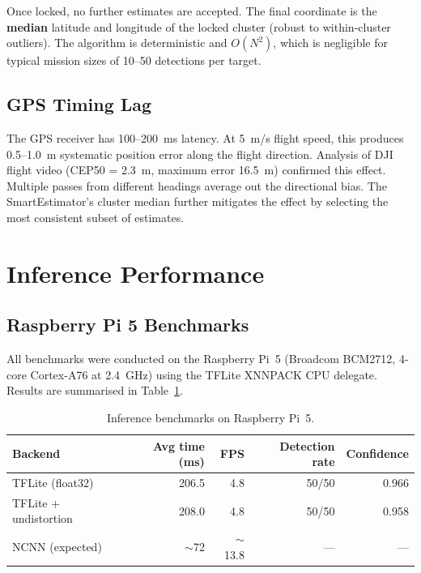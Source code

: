 Once locked, no further estimates are accepted. The final coordinate is the
\textbf{median} latitude and longitude of the locked cluster (robust to within-cluster
outliers). The algorithm is deterministic and $O(N^2)$, which is negligible for
typical mission sizes of 10--50 detections per target.

\subsection{GPS Timing Lag}

The GPS receiver has 100--200~ms latency. At 5~m/s flight speed, this produces
0.5--1.0~m systematic position error along the flight direction. Analysis of DJI
flight video (CEP50 = 2.3~m, maximum error 16.5~m) confirmed this effect.
Multiple passes from different headings average out the directional bias. The
SmartEstimator's cluster median further mitigates the effect by selecting the
most consistent subset of estimates.


\section{Inference Performance}
\label{sec:inference-performance}

\subsection{Raspberry Pi 5 Benchmarks}

All benchmarks were conducted on the Raspberry Pi~5 (Broadcom BCM2712, 4-core
Cortex-A76 at 2.4~GHz) using the TFLite XNNPACK CPU delegate. Results are
summarised in Table~\ref{tab:pi-benchmarks}.

\begin{table}[htbp]
\centering
\caption{Inference benchmarks on Raspberry Pi~5.}
\label{tab:pi-benchmarks}
\begin{tabular}{lrrrr}
\hline
\textbf{Backend} & \textbf{Avg time (ms)} & \textbf{FPS} &
\textbf{Detection rate} & \textbf{Confidence} \\
\hline
TFLite (float32)          & 206.5 & 4.8  & 50/50 & 0.966 \\
TFLite + undistortion     & 208.0 & 4.8  & 50/50 & 0.958 \\
NCNN (expected)           & $\sim$72 & $\sim$13.8 & --- & --- \\
\hline
\end{tabular}
\end{table}

